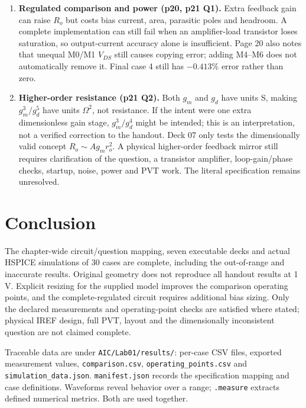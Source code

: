 \begin{enumerate}
\item \textbf{Regulated comparison and power (p20, p21 Q1).} Extra feedback gain can raise $R_o$ but costs bias current, area, parasitic poles and headroom. A complete implementation can still fail when an amplifier-load transistor loses saturation, so output-current accuracy alone is insufficient. Page 20 also notes that unequal M0/M1 $V_{DS}$ still causes copying error; adding M4--M6 does not automatically remove it. Final case 4 still has $-0.413\%$ error rather than zero.
\item \textbf{Higher-order resistance (p21 Q2).} Both $g_m$ and $g_d$ have units S, making $g_m^3/g_d^5$ have units $\Omega^2$, not resistance. If the intent were one extra dimensionless gain stage, $g_m^3/g_d^4$ might be intended; this is an interpretation, not a verified correction to the handout. Deck 07 only tests the dimensionally valid concept $R_o\sim A g_mr_o^2$. A physical higher-order feedback mirror still requires clarification of the question, a transistor amplifier, loop-gain/phase checks, startup, noise, power and PVT work. The literal specification remains unresolved.
\end{enumerate}

\section{Conclusion}
The chapter-wide circuit/question mapping, seven executable decks and actual HSPICE simulations of 30 cases are complete, including the out-of-range and inaccurate results. Original geometry does not reproduce all handout results at 1 V. Explicit resizing for the supplied model improves the comparison operating points, and the complete-regulated circuit requires additional bias sizing. Only the declared measurements and operating-point checks are satisfied where stated; physical IREF design, full PVT, layout and the dimensionally inconsistent question are not claimed complete.

Traceable data are under \texttt{AIC/Lab01/results/}: per-case CSV files, exported measurement values, \texttt{comparison.csv}, \texttt{operating\_points.csv} and \texttt{simulation\_data.json}. \texttt{manifest.json} records the specification mapping and case definitions. Waveforms reveal behavior over a range; \texttt{.measure} extracts defined numerical metrics. Both are used together.
